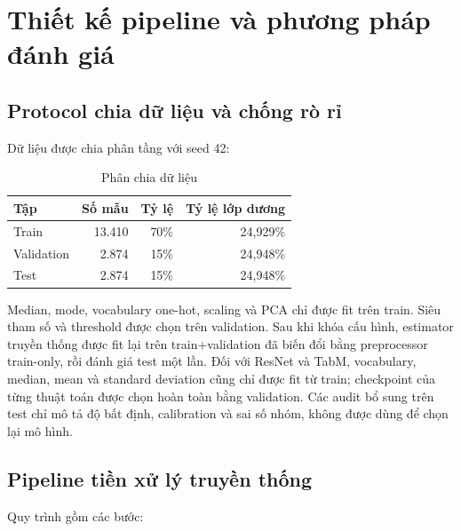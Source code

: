 \documentclass[12pt,a4paper,oneside]{report}
\begin{document}
\chapter{Thiết kế pipeline và phương pháp đánh giá}

\section{Protocol chia dữ liệu và chống rò rỉ}

Dữ liệu được chia phân tầng với seed 42:

\begin{table}[H]
\centering
\caption{Phân chia dữ liệu}\label{tab:data-split}
\begin{tabular}{lrrr}
\toprule
\textbf{Tập} & \textbf{Số mẫu} & \textbf{Tỷ lệ} & \textbf{Tỷ lệ lớp dương} \\
\midrule
Train & 13.410 & 70\% & 24,929\% \\
Validation & 2.874 & 15\% & 24,948\% \\
Test & 2.874 & 15\% & 24,948\% \\
\bottomrule
\end{tabular}
\end{table}

Median, mode, vocabulary one-hot, scaling và PCA chỉ được fit trên train. Siêu tham số và threshold được chọn trên validation. Sau khi khóa cấu hình, estimator truyền thống được fit lại trên train+validation đã biến đổi bằng preprocessor train-only, rồi đánh giá test một lần. Đối với ResNet và TabM, vocabulary, median, mean và standard deviation cũng chỉ được fit từ train; checkpoint của từng thuật toán được chọn hoàn toàn bằng validation. Các audit bổ sung trên test chỉ mô tả độ bất định, calibration và sai số nhóm, không được dùng để chọn lại mô hình.

\section{Pipeline tiền xử lý truyền thống}

Quy trình gồm các bước:
\end{document}
